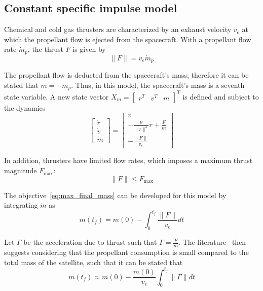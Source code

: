 \subsection{Constant specific impulse model}

Chemical and cold gas thrusters are characterized by an exhaust velocity \(v_e\) at which the propellant flow is ejected from the spacecraft. With a propellant flow rate \(\dot m_p\), the thrust \(F\) is given by
\begin{equation}
   \lVert F \rVert = v_e \dot m_p
\end{equation}

The propellant flow is deducted from the spacecraft's mass; therefore it can be stated that \(\dot m = - \dot m_p\). Thus, in this model, the spacecraft's mass is a seventh state variable. A new state vector \(X_m = \begin{bmatrix}
    r^T & v^T & m 
\end{bmatrix}^T\) is defined and subject to the dynamics
\begin{equation}
    \begin{bmatrix}
        \dot r \\ \dot v \\ \dot m
    \end{bmatrix} = \begin{bmatrix}
        v \\ -\frac{\mu}{\lVert r \rVert^3}r + \frac{F}{m} \\ -\frac{\lVert F \rVert}{v_e}
    \end{bmatrix}
\end{equation}

In addition, thrusters have limited flow rates, which imposes a maximum thrust magnitude \(F_{\max}\):
\begin{equation}
    \lVert F \rVert \leq F_{\max}
\end{equation}

The objective~\eqref{eq:max_final_mass} can be developed for this model by integrating \(\dot m\) as
\begin{equation}
    m(t_f) = m(0) - \int_0^{t_f} \frac{\lVert F \rVert}{v_e} dt
\end{equation}

Let \(\Gamma\) be the acceleration due to thrust such that \(\Gamma = \frac{F}{m}\). The literature~\cite{Conway_2010} then suggests considering that the propellant consumption is small compared to the total mass of the satellite, such that it can be stated that
\begin{equation}
    m(t_f) \approx m(0) - \frac{m(0)}{v_e}\int_0^{t_f} \lVert \Gamma \rVert dt
\end{equation}

